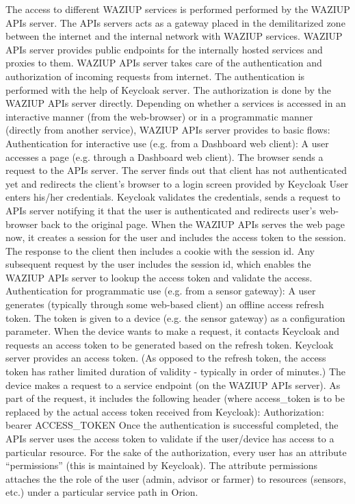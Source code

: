The access to different WAZIUP services is performed performed by the WAZIUP APIs server. The APIs servers acts as a gateway placed in the demilitarized zone between the internet and the internal network with WAZIUP services. WAZIUP APIs server provides public endpoints for the internally hosted services and proxies to them. 
WAZIUP APIs server takes care of the authentication and authorization of incoming requests from internet. The authentication is performed with the help of Keycloak server. The authorization is done by the WAZIUP APIs server directly.
Depending on whether a services is accessed in an interactive manner (from the web-browser) or in a programmatic manner (directly from another service), WAZIUP APIs server provides to basic flows:
Authentication for interactive use (e.g. from a Dashboard web client):
A user accesses a page (e.g. through a Dashboard web client). The browser sends a request to the APIs server.
The server finds out that client has not authenticated yet and redirects the client’s browser to a login screen provided by Keycloak
User enters his/her credentials.
Keycloak validates the credentials, sends a request to APIs server notifying it that the user is authenticated and redirects user’s web-browser back to the original page.
When the WAZIUP APIs serves the web page now, it creates a session for the user and includes the access token to the session. The response to the client then includes a cookie with the session id.
Any subsequent request by the user includes the session id, which enables the WAZIUP APIs server to lookup the access token and validate the access.
Authentication for programmatic use (e.g. from a sensor gateway):
A user generates (typically through some web-based client) an offline access refresh token. The token is given to a device (e.g. the sensor gateway) as a configuration parameter.
When the device wants to make a request, it contacts Keycloak and requests an access token to be generated based on the refresh token.
Keycloak server provides an access token. (As opposed to the refresh token, the access token has rather limited duration of validity - typically in order of minutes.)
The device makes a request to a service endpoint (on the WAZIUP APIs server). As part of the request, it includes the following header (where access_token is to be replaced by the actual access token received from Keycloak):
Authorization: bearer ACCESS_TOKEN
Once the authentication is successful completed, the APIs server uses the access token to validate if the user/device has access to a particular resource.
For the sake of the authorization, every user has an attribute “permissions” (this is maintained by Keycloak). The attribute permissions attaches the the role of the user (admin, advisor or farmer) to resources (sensors, etc.) under a particular service path in Orion. 

